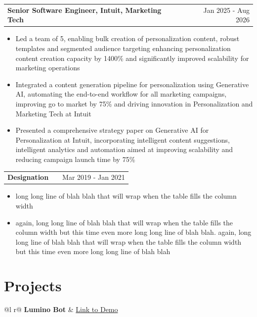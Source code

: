 \documentclass[a4paper,11pt]{article}
\makeatletter
\newenvironment{joblong}[2]
    {
    \begin{tabularx}{\linewidth}{@{}l X r@{}}
    \textbf{#1} & \hfill &  #2 \\[3.75pt]
    \end{tabularx}
    \begin{minipage}[t]{\linewidth}
    \begin{itemize}[nosep,after=\strut, leftmargin=1em, itemsep=3pt,label=--]
    }
    {
    \end{itemize}
    \end{minipage}    
    }
\makeatother
\begin{document}
\begin{joblong}{Senior Software Engineer, Intuit, Marketing Tech}{Jan 2025 - Aug 2026}
	\item Led a team of 5, enabling bulk creation of personalization content, robust templates and segmented audience targeting enhancing personalization content creation capacity by 1400\% and significantly improved scalability for marketing operations
	\item Integrated a content generation pipeline for personalization using Generative AI, automating the end-to-end workflow for all marketing campaigns, improving go to market by 75\% and driving innovation in Personalization and Marketing Tech at Intuit
	\item Presented a comprehensive strategy paper on Generative AI for Personalization at Intuit, incorporating intelligent content suggestions, intelligent analytics and automation aimed at improving scalability and reducing campaign launch time by 75\%
\end{joblong}


\begin{joblong}{Designation}{Mar 2019 - Jan 2021}
	\item long long line of blah blah that will wrap when the table fills the column width
	\item again, long long line of blah blah that will wrap when the table fills the column width but this time even more long long line of blah blah. again, long long line of blah blah that will wrap when the table fills the column width but this time even more long long line of blah blah
\end{joblong}

\section{Projects}

\begin{tabularx}{\linewidth}{ @{}l r@{} }
	\textbf{Lumino Bot} & \hfill \href{https://some-link.com}{Link to Demo}                                                                                                                                                                                                                                                                                       \\[3.75pt]
	 \\
\end{tabularx}
\end{document}
